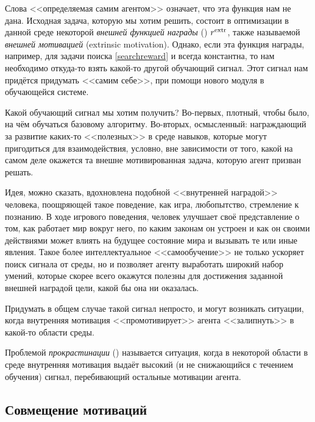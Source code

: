 Слова <<определяемая самим агентом>> означает, что эта функция нам не дана. Исходная задача, которую мы хотим решить, состоит в оптимизации в данной среде некоторой \emph{внешней функцией награды} () $r^{\mathrm{extr}}$, также называемой \emph{внешней мотивацией} (extrinsic motivation). Однако, если эта функция награды, например, для задачи поиска \eqref{searchreward} и всегда константна, то нам необходимо откуда-то взять какой-то другой обучающий сигнал. Этот сигнал нам придётся придумать <<самим себе>>, при помощи нового модуля в обучающейся системе.

Какой обучающий сигнал мы хотим получить? Во-первых, плотный, чтобы было, на чём обучаться базовому алгоритму. Во-вторых, осмысленный: награждающий за развитие каких-то <<полезных>> в среде навыков, которые могут пригодиться для взаимодействия, условно, вне зависимости от того, какой на самом деле окажется та внешне мотивированная задача, которую агент призван решать.

\begin{example}
Идея, можно сказать, вдохновлена подобной <<внутренней наградой>> человека, поощряющей такое поведение, как игра, любопытство, стремление к познанию. В ходе игрового поведения, человек улучшает своё представление о том, как работает мир вокруг него, по каким законам он устроен и как он своими действиями может влиять на будущее состояние мира и вызывать те или иные явления. Такое более интеллектуальное <<самообучение>> не только ускоряет поиск сигнала от среды, но и позволяет агенту выработать широкий набор умений, которые скорее всего окажутся полезны для достижения заданной внешней наградой цели, какой бы она ни оказалась.
\end{example}

Придумать в общем случае такой сигнал непросто, и могут возникать ситуации, когда внутренняя мотивация <<промотивирует>> агента <<залипнуть>> в какой-то области среды.

\begin{definition}
Проблемой \emph{прокрастинации} () называется ситуация, когда в некоторой области в среде внутренняя мотивация выдаёт высокий (и не снижающийся с течением обучения) сигнал, перебивающий остальные мотивации агента.
\end{definition}

\subsection{Совмещение мотиваций}

